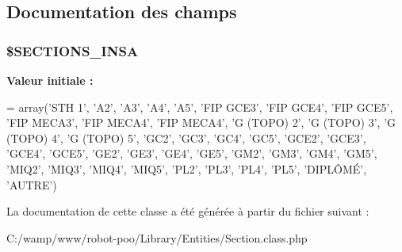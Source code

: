 \subsection{Documentation des champs}
\hypertarget{class_library_1_1_entities_1_1_section_a59001887ac2d80503ba71b62918eb032}{
\subsubsection[{\$\+S\+E\+C\+T\+I\+O\+N\+S\+\_\+\+I\+N\+S\+A}]{\setlength{\rightskip}{0pt plus 5cm}\$S\+E\+C\+T\+I\+O\+N\+S\+\_\+\+I\+N\+S\+A\hspace{0.3cm}{\ttfamily [static]}}}\label{class_library_1_1_entities_1_1_section_a59001887ac2d80503ba71b62918eb032}
{\bfseries Valeur initiale \+:}
\begin{DoxyCode}
= array(\textcolor{stringliteral}{'STH 1'}, 
                            \textcolor{stringliteral}{'A2'}, \textcolor{stringliteral}{'A3'}, \textcolor{stringliteral}{'A4'}, \textcolor{stringliteral}{'A5'}, 
                            \textcolor{stringliteral}{'FIP GCE3'}, \textcolor{stringliteral}{'FIP GCE4'}, \textcolor{stringliteral}{'FIP GCE5'}, 
                            \textcolor{stringliteral}{'FIP MECA3'}, \textcolor{stringliteral}{'FIP MECA4'}, \textcolor{stringliteral}{'FIP MECA4'}, 
                            \textcolor{stringliteral}{'G (TOPO) 2'}, \textcolor{stringliteral}{'G (TOPO) 3'}, \textcolor{stringliteral}{'G (TOPO) 4'}, \textcolor{stringliteral}{'G (TOPO) 5'}, 
                            \textcolor{stringliteral}{'GC2'}, \textcolor{stringliteral}{'GC3'}, \textcolor{stringliteral}{'GC4'}, \textcolor{stringliteral}{'GC5'}, 
                            \textcolor{stringliteral}{'GCE2'}, \textcolor{stringliteral}{'GCE3'}, \textcolor{stringliteral}{'GCE4'}, \textcolor{stringliteral}{'GCE5'}, 
                            \textcolor{stringliteral}{'GE2'}, \textcolor{stringliteral}{'GE3'}, \textcolor{stringliteral}{'GE4'}, \textcolor{stringliteral}{'GE5'}, 
                            \textcolor{stringliteral}{'GM2'}, \textcolor{stringliteral}{'GM3'}, \textcolor{stringliteral}{'GM4'}, \textcolor{stringliteral}{'GM5'}, 
                            \textcolor{stringliteral}{'MIQ2'}, \textcolor{stringliteral}{'MIQ3'}, \textcolor{stringliteral}{'MIQ4'}, \textcolor{stringliteral}{'MIQ5'}, 
                            \textcolor{stringliteral}{'PL2'}, \textcolor{stringliteral}{'PL3'}, \textcolor{stringliteral}{'PL4'}, \textcolor{stringliteral}{'PL5'}, 
                            \textcolor{stringliteral}{'DIPLÔMÉ'}, \textcolor{stringliteral}{'AUTRE'})
\end{DoxyCode}


La documentation de cette classe a été générée à partir du fichier suivant \+:\begin{DoxyCompactItemize}
\item 
C\+:/wamp/www/robot-\/poo/\+Library/\+Entities/Section.\+class.\+php\end{DoxyCompactItemize}
